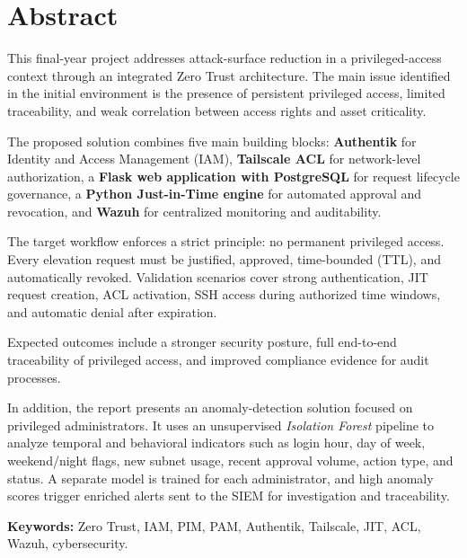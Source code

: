 \chapter*{Abstract}

This final-year project addresses attack-surface reduction in a privileged-access context through an integrated Zero Trust architecture. The main issue identified in the initial environment is the presence of persistent privileged access, limited traceability, and weak correlation between access rights and asset criticality.

The proposed solution combines five main building blocks: \textbf{Authentik} for Identity and Access Management (IAM), \textbf{Tailscale ACL} for network-level authorization, a \textbf{Flask web application with PostgreSQL} for request lifecycle governance, a \textbf{Python Just-in-Time engine} for automated approval and revocation, and \textbf{Wazuh} for centralized monitoring and auditability.

The target workflow enforces a strict principle: no permanent privileged access. Every elevation request must be justified, approved, time-bounded (TTL), and automatically revoked. Validation scenarios cover strong authentication, JIT request creation, ACL activation, SSH access during authorized time windows, and automatic denial after expiration.

Expected outcomes include a stronger security posture, full end-to-end traceability of privileged access, and improved compliance evidence for audit processes.

In addition, the report presents an anomaly-detection solution focused on privileged administrators. It uses an unsupervised \textit{Isolation Forest} pipeline to analyze temporal and behavioral indicators such as login hour, day of week, weekend/night flags, new subnet usage, recent approval volume, action type, and status. A separate model is trained for each administrator, and high anomaly scores trigger enriched alerts sent to the SIEM for investigation and traceability.

\textbf{Keywords:} Zero Trust, IAM, PIM, PAM, Authentik, Tailscale, JIT, ACL, Wazuh, cybersecurity.

\clearpage
